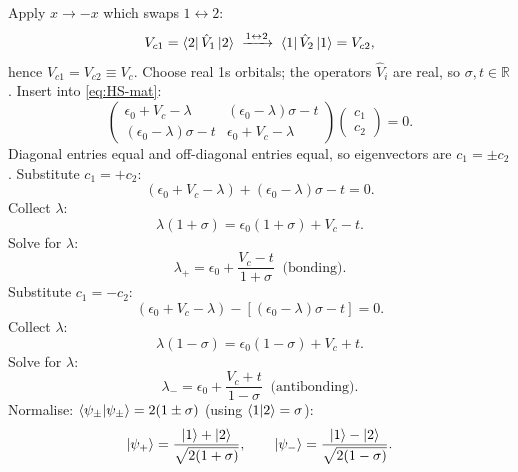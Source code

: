 \documentclass[11pt]{article}
\begin{document}
Apply $x\to-x$ which swaps $1\leftrightarrow2$:
\begin{equation}
V_{c1}=\bra2\hat V_1\ket2\;\xrightarrow{1\leftrightarrow 2}\;\bra1\hat V_2\ket1=V_{c2},
\end{equation}
hence $V_{c1}=V_{c2}\equiv V_c$. Choose real 1s orbitals; the operators $\hat V_i$ are real, so $\sigma,t\in\mathbb R$. Insert into \eqref{eq:HS-mat}:
\begin{equation}
\begin{pmatrix}\epsilon_0+V_c-\lambda&(\epsilon_0-\lambda)\sigma-t\\(\epsilon_0-\lambda)\sigma-t&\epsilon_0+V_c-\lambda\end{pmatrix}\begin{pmatrix}c_1\\c_2\end{pmatrix}=0.
\label{eq:secular-sym}
\end{equation}
Diagonal entries equal and off-diagonal entries equal, so eigenvectors are $c_1=\pm c_2$. Substitute $c_1=+c_2$:
\begin{equation}
(\epsilon_0+V_c-\lambda)+(\epsilon_0-\lambda)\sigma-t=0.
\end{equation}
Collect $\lambda$:
\begin{equation}
\lambda(1+\sigma)=\epsilon_0(1+\sigma)+V_c-t.
\end{equation}
Solve for $\lambda$:
\begin{equation}
\boxed{\,\lambda_+=\epsilon_0+\frac{V_c-t}{1+\sigma}\;\;\text{(bonding)}.\,}
\label{eq:lambda+}
\end{equation}
Substitute $c_1=-c_2$:
\begin{equation}
(\epsilon_0+V_c-\lambda)-[(\epsilon_0-\lambda)\sigma-t]=0.
\end{equation}
Collect $\lambda$:
\begin{equation}
\lambda(1-\sigma)=\epsilon_0(1-\sigma)+V_c+t.
\end{equation}
Solve for $\lambda$:
\begin{equation}
\boxed{\,\lambda_-=\epsilon_0+\frac{V_c+t}{1-\sigma}\;\;\text{(antibonding)}.\,}
\label{eq:lambda-}
\end{equation}
Normalise: $\braket{\psi_\pm|\psi_\pm}=2(1\pm\sigma)$ (using $\braket{1|2}=\sigma$):
\begin{equation}
\ket{\psi_+}=\frac{\ket1+\ket2}{\sqrt{2(1+\sigma)}},\qquad\ket{\psi_-}=\frac{\ket1-\ket2}{\sqrt{2(1-\sigma)}}.
\label{eq:psipm}
\end{equation}
\end{document}
